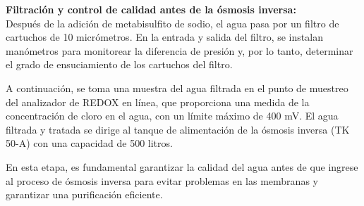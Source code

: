\textbf{Filtración y control de calidad antes de la ósmosis inversa:}\\
Después de la adición de metabisulfito de sodio, el agua pasa por un filtro de cartuchos de 10 micrómetros. En la entrada y salida del filtro,
se instalan manómetros para monitorear la diferencia de presión y, por lo tanto, determinar el grado de ensuciamiento de los cartuchos del filtro.

A continuación, se toma una muestra del agua filtrada en el punto de muestreo del analizador de REDOX en línea, que proporciona una medida de
la concentración de cloro en el agua, con un límite máximo de 400 mV. El agua filtrada y tratada se dirige al tanque de alimentación de la ósmosis
inversa (TK 50-A) con una capacidad de 500 litros. 

En esta etapa, es fundamental garantizar la calidad del agua antes de que ingrese al proceso de ósmosis inversa para evitar problemas en las
membranas y garantizar una purificación eficiente.

